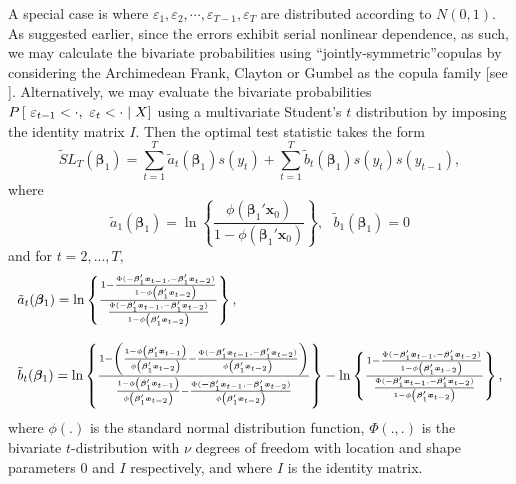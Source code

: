 \documentclass[harvard,11pt]{article}
\begin{document}
 A special case is where $\varepsilon_1,\varepsilon_2,\cdots,\varepsilon_{T-1},\varepsilon_T$ are distributed according to $N(0,1)$. As suggested earlier, since the errors exhibit serial nonlinear dependence, as such, we may calculate the bivariate probabilities using \textquotedblleft jointly-symmetric\textquotedblright copulas by considering the Archimedean Frank, Clayton or Gumbel as the copula family [see \citet{joe2014dependence}]. Alternatively, we may evaluate the bivariate probabilities $P\left[ \text{ }\varepsilon_{t-1}<\cdot ,\-
\text{ }\varepsilon_{t}<\cdot \mid X\right]$ using a multivariate Student's $t$ distribution by imposing the identity matrix $I$.
 Then the optimal test statistic takes the form 
\begin{equation*}
\tilde{S}L_{T}(\bm{\beta}_{1})=\sum\limits_{t=1}^{T}\tilde{a}_{t}(\bm{\beta}_{1})%
s(y_{t})+\sum\limits_{t=1}^{T}\tilde{b}_{t}(\bm{\beta}_{1})%
s(y_{t})s(y_{t-1}),
\end{equation*}%
where%
\begin{equation*}
\tilde{a}_{1}(\bm{\beta}_{1})=\ln \left\{ \frac{\phi(\bm{\beta}_1'\bm{x}_0) }{1-\phi(\bm{\beta}_1'\bm{x}_0)}\right\} ,\text{ }\tilde{b}_{1}(\bm{\beta}_{1})=0
\end{equation*}%
and for $t=2,...,T,$%
\begin{equation*}
\begin{tabular}{l}
$\tilde{a}_{t}(\bm{\beta} _{1})=\ln \left\{ \frac{1-\frac{\Phi(-\bm{\beta}_1'\bm{x}_{t-1},-\bm{\beta}_1'\bm{x}_{t-2}) }{1-\phi\left(\bm{\beta}_1'\bm{x}_{t-2}\right)}}{\frac{\Phi(-\bm{\beta}_1'\bm{x}_{t-1},-\bm{\beta}_1'\bm{x}_{t-2}) }{1-\phi\left(\bm{\beta}_1'\bm{x}_{t-2}\right)}}\right\}, $ \\ 
\\ 
$\tilde{b}_{t}(\bm{\beta}_{1})=\ln \left\{ \frac{1-\left( \frac{1-\phi\left(\bm{\beta}_1'\bm{x}_{t-1}\right) }{\phi\left(\bm{\beta}_1'\bm{x}_{t-2}\right) }-\frac{\Phi(-\bm{\beta}_1'\bm{x}_{t-1},-\bm{\beta}_1'\bm{x}_{t-2}) }{\phi\left(\bm{\beta}_1'\bm{x}_{t-2}\right) }\right) }{\frac{1-\phi\left(\bm{\beta}_1'\bm{x}_{t-1}\right)}{\phi\left(\bm{\beta}_1'\bm{x}_{t-2}\right) }-\frac{\Phi(\bm{-\beta}_1'\bm{x}_{t-1},-\bm{\beta}_1'\bm{x}_{t-2}) }{\phi\left(\bm{\beta}_1'\bm{x}_{t-2}\right)}}\right\} -\ln \left\{ \frac{1-\frac{\Phi(-\bm{\beta}_1'\bm{x}_{t-1},-\bm{\beta}_1'\bm{x}_{t-2}) }{1-\phi\left(\bm{\beta}_1'\bm{x}_{t-2}\right) }}{\frac{\Phi(-\bm{\beta}_1'\bm{x}_{t-1},-\bm{\beta}_1'\bm{x}_{t-2})}{1-\phi\left(\bm{\beta}_1'\bm{x}_{t-2}\right)}}\right\}, $%
\end{tabular}%
\end{equation*}%
where $\phi(.)$ is the standard normal distribution function, $\Phi(.,.)$ is the bivariate $t$-distribution with $\nu$ degrees of freedom with location and shape parameters $0$ and $I$ respectively, and where $I$ is the identity matrix.
\end{document}
